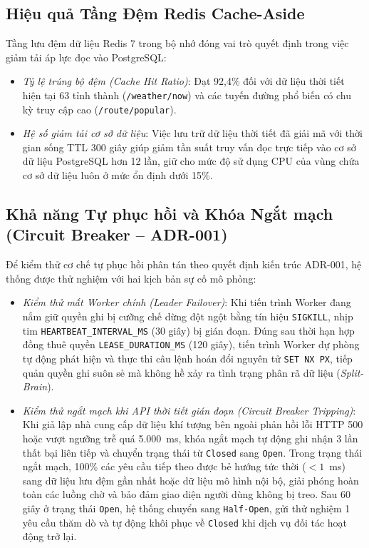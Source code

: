 \subsection{Hiệu quả Tầng Đệm Redis Cache-Aside}
Tầng lưu đệm dữ liệu Redis 7 trong bộ nhớ đóng vai trò quyết định trong việc giảm tải áp lực đọc vào PostgreSQL:
\begin{itemize}
    \item[-] \textit{Tỷ lệ trúng bộ đệm (Cache Hit Ratio)}: Đạt 92,4\% đối với dữ liệu thời tiết hiện tại 63 tỉnh thành (\texttt{/weather/now}) và các tuyến đường phổ biến có chu kỳ truy cập cao (\texttt{/route/popular}).
    \item[-] \textit{Hệ số giảm tải cơ sở dữ liệu}: Việc lưu trữ dữ liệu thời tiết đã giải mã với thời gian sống TTL 300 giây giúp giảm tần suất truy vấn đọc trực tiếp vào cơ sở dữ liệu PostgreSQL hơn 12 lần, giữ cho mức độ sử dụng CPU của vùng chứa cơ sở dữ liệu luôn ở mức ổn định dưới 15\%.
\end{itemize}

\subsection{Khả năng Tự phục hồi và Khóa Ngắt mạch (Circuit Breaker -- ADR-001)}
Để kiểm thử cơ chế tự phục hồi phân tán theo quyết định kiến trúc ADR-001, hệ thống được thử nghiệm với hai kịch bản sự cố mô phỏng:
\begin{itemize}
    \item[-] \textit{Kiểm thử mất Worker chính (Leader Failover)}: Khi tiến trình Worker đang nắm giữ quyền ghi bị cưỡng chế dừng đột ngột bằng tín hiệu \texttt{SIGKILL}, nhịp tim \texttt{HEARTBEAT\_INTERVAL\_MS} (30 giây) bị gián đoạn. Đúng sau thời hạn hợp đồng thuê quyền \texttt{LEASE\_\allowbreak DURATION\_\allowbreak MS} (120 giây), tiến trình Worker dự phòng tự động phát hiện và thực thi câu lệnh hoán đổi nguyên tử \texttt{SET NX PX}, tiếp quản quyền ghi suôn sẻ mà không hề xảy ra tình trạng phân rã dữ liệu (\textit{Split-Brain}).
    \item[-] \textit{Kiểm thử ngắt mạch khi API thời tiết gián đoạn (Circuit Breaker Tripping)}: Khi giả lập nhà cung cấp dữ liệu khí tượng bên ngoài phản hồi lỗi HTTP 500 hoặc vượt ngưỡng trễ quá 5.000~ms, khóa ngắt mạch tự động ghi nhận 3 lần thất bại liên tiếp và chuyển trạng thái từ \texttt{Closed} sang \texttt{Open}. Trong trạng thái ngắt mạch, 100\% các yêu cầu tiếp theo được bẻ hướng tức thời ($< 1$~ms) sang dữ liệu lưu đệm gần nhất hoặc dữ liệu mô hình nội bộ, giải phóng hoàn toàn các luồng chờ và bảo đảm giao diện người dùng không bị treo. Sau 60 giây ở trạng thái \texttt{Open}, hệ thống chuyển sang \texttt{Half-Open}, gửi thử nghiệm 1 yêu cầu thăm dò và tự động khôi phục về \texttt{Closed} khi dịch vụ đối tác hoạt động trở lại.
\end{itemize}

